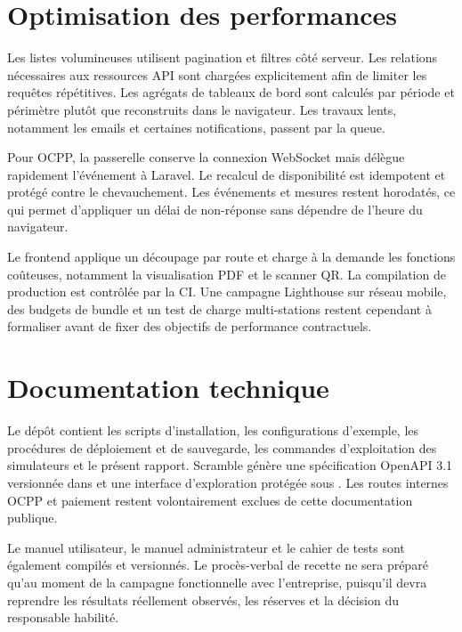 \section{Optimisation des performances}

Les listes volumineuses utilisent pagination et filtres côté serveur. Les
relations nécessaires aux ressources API sont chargées explicitement afin de
limiter les requêtes répétitives. Les agrégats de tableaux de bord sont calculés
par période et périmètre plutôt que reconstruits dans le navigateur. Les travaux
lents, notamment les emails et certaines notifications, passent par la queue.

Pour OCPP, la passerelle conserve la connexion WebSocket mais délègue rapidement
l'événement à Laravel. Le recalcul de disponibilité est idempotent et protégé
contre le chevauchement. Les événements et mesures restent horodatés, ce qui
permet d'appliquer un délai de non-réponse sans dépendre de l'heure du navigateur.

Le frontend applique un découpage par route et charge à la demande les fonctions
coûteuses, notamment la visualisation PDF et le scanner QR. La compilation de
production est contrôlée par la CI. Une campagne Lighthouse sur réseau mobile,
des budgets de bundle et un test de charge multi-stations restent cependant à
formaliser avant de fixer des objectifs de performance contractuels.

\section{Documentation technique}

Le dépôt contient les scripts d'installation, les configurations d'exemple, les
procédures de déploiement et de sauvegarde, les commandes d'exploitation des
simulateurs et le présent rapport. Scramble génère
une spécification OpenAPI 3.1 versionnée dans
 et une interface d'exploration protégée sous
. Les routes internes OCPP et paiement restent volontairement
exclues de cette documentation publique.

Le manuel utilisateur, le manuel administrateur et le cahier de tests sont
également compilés et versionnés. Le procès-verbal de recette ne sera préparé
qu'au moment de la campagne fonctionnelle avec l'entreprise, puisqu'il devra
reprendre les résultats réellement observés, les réserves et la décision du
responsable habilité.
